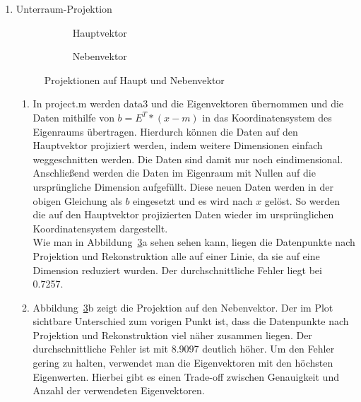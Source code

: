 \documentclass[]{report}
\newlength\figureheight
\newlength\figurewidth
\begin{document}
\begin{enumerate}
\begin{enumerate}
		\end{enumerate}
		\item Unterraum-Projektion
		
		\setlength\figureheight{3.5cm}
		\setlength{}
		\begin{figure}[tbp!]
			\begin{subfigure}{0.45\textwidth}
				\centering
				
				\caption{Hauptvektor}
				\label{fig:projection1}
			\end{subfigure}
			\qquad
			\begin{subfigure}{0.45\textwidth}
				\centering
				
				\caption{Nebenvektor}
				\label{fig:projection2}
			\end{subfigure}	
			\caption{Projektionen auf Haupt und Nebenvektor}
			\label{fig:projection}
		\end{figure}
		
		\begin{enumerate}
			\item
			In project.m werden data3 und die Eigenvektoren übernommen und die Daten mithilfe von $b=E^{T}*(x-m)$ in das Koordinatensystem des Eigenraums übertragen. Hierdurch können die Daten auf den Hauptvektor projiziert werden, indem weitere Dimensionen einfach weggeschnitten werden. Die Daten sind damit nur noch eindimensional.\\
			Anschließend werden die Daten im Eigenraum mit Nullen auf die ursprüngliche Dimension aufgefüllt. Diese neuen Daten werden in der obigen Gleichung als $b$ eingesetzt und es wird nach $x$ gelöst. So werden die auf den Hauptvektor projizierten Daten wieder im ursprünglichen Koordinatensystem dargestellt.\\
			Wie man in Abbildung~\ref{fig:projection}a sehen sehen kann, liegen die Datenpunkte nach Projektion und Rekonstruktion alle auf einer Linie, da sie auf eine Dimension reduziert wurden. Der durchschnittliche Fehler liegt bei 0.7257.
			\item
			Abbildung~\ref{fig:projection}b zeigt die Projektion auf den Nebenvektor. Der im Plot sichtbare Unterschied zum vorigen Punkt ist, dass die Datenpunkte nach Projektion und Rekonstruktion viel näher zusammen liegen. Der durchschnittliche Fehler ist mit 8.9097 deutlich höher. Um den Fehler gering zu halten, verwendet man die Eigenvektoren mit den höchsten Eigenwerten. Hierbei gibt es einen Trade-off zwischen Genauigkeit und Anzahl der verwendeten Eigenvektoren.
		\end{enumerate}
		

\end{enumerate}
\end{document}
